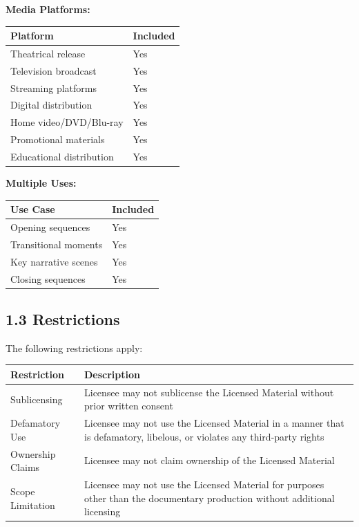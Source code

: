 \documentclass[
  11pt,
]{article}
\begin{document}
\textbf{Media Platforms:}

\begin{table}[h]
\centering
\begin{tabular}{L{5cm}C{3cm}}
\toprule
\textbf{Platform} & \textbf{Included} \\
\midrule
Theatrical release & Yes \\
Television broadcast & Yes \\
Streaming platforms & Yes \\
Digital distribution & Yes \\
Home video/DVD/Blu-ray & Yes \\
Promotional materials & Yes \\
Educational distribution & Yes \\
\bottomrule
\end{tabular}
\end{table}

\textbf{Multiple Uses:}

\begin{table}[h]
\centering
\begin{tabular}{L{5cm}C{3cm}}
\toprule
\textbf{Use Case} & \textbf{Included} \\
\midrule
Opening sequences & Yes \\
Transitional moments & Yes \\
Key narrative scenes & Yes \\
Closing sequences & Yes \\
\bottomrule
\end{tabular}
\end{table}

\hypertarget{restrictions}{%
\subsection{1.3 Restrictions}\label{restrictions}}

The following restrictions apply:

\begin{table}[h]
\centering
\begin{tabular}{L{3.5cm}L{10.5cm}}
\toprule
\textbf{Restriction} & \textbf{Description} \\
\midrule
Sublicensing & Licensee may not sublicense the Licensed Material without prior written consent \\
Defamatory Use & Licensee may not use the Licensed Material in a manner that is defamatory, libelous, or violates any third-party rights \\
Ownership Claims & Licensee may not claim ownership of the Licensed Material \\
Scope Limitation & Licensee may not use the Licensed Material for purposes other than the documentary production without additional licensing \\
\bottomrule
\end{tabular}
\end{table}
\end{document}
